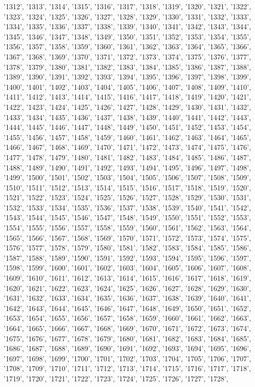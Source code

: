 '1312', '1313', '1314', '1315', '1316', '1317', '1318', '1319', '1320', '1321', '1322', '1323', '1324', '1325', '1326', '1327', '1328', '1329', '1330', '1331', '1332', '1333', '1334', '1335', '1336', '1337', '1338', '1339', '1340', '1341', '1342', '1343', '1344', '1345', '1346', '1347', '1348', '1349', '1350', '1351', '1352', '1353', '1354', '1355', '1356', '1357', '1358', '1359', '1360', '1361', '1362', '1363', '1364', '1365', '1366', '1367', '1368', '1369', '1370', '1371', '1372', '1373', '1374', '1375', '1376', '1377', '1378', '1379', '1380', '1381', '1382', '1383', '1384', '1385', '1386', '1387', '1388', '1389', '1390', '1391', '1392', '1393', '1394', '1395', '1396', '1397', '1398', '1399', '1400', '1401', '1402', '1403', '1404', '1405', '1406', '1407', '1408', '1409', '1410', '1411', '1412', '1413', '1414', '1415', '1416', '1417', '1418', '1419', '1420', '1421', '1422', '1423', '1424', '1425', '1426', '1427', '1428', '1429', '1430', '1431', '1432', '1433', '1434', '1435', '1436', '1437', '1438', '1439', '1440', '1441', '1442', '1443', '1444', '1445', '1446', '1447', '1448', '1449', '1450', '1451', '1452', '1453', '1454', '1455', '1456', '1457', '1458', '1459', '1460', '1461', '1462', '1463', '1464', '1465', '1466', '1467', '1468', '1469', '1470', '1471', '1472', '1473', '1474', '1475', '1476', '1477', '1478', '1479', '1480', '1481', '1482', '1483', '1484', '1485', '1486', '1487', '1488', '1489', '1490', '1491', '1492', '1493', '1494', '1495', '1496', '1497', '1498', '1499', '1500', '1501', '1502', '1503', '1504', '1505', '1506', '1507', '1508', '1509', '1510', '1511', '1512', '1513', '1514', '1515', '1516', '1517', '1518', '1519', '1520', '1521', '1522', '1523', '1524', '1525', '1526', '1527', '1528', '1529', '1530', '1531', '1532', '1533', '1534', '1535', '1536', '1537', '1538', '1539', '1540', '1541', '1542', '1543', '1544', '1545', '1546', '1547', '1548', '1549', '1550', '1551', '1552', '1553', '1554', '1555', '1556', '1557', '1558', '1559', '1560', '1561', '1562', '1563', '1564', '1565', '1566', '1567', '1568', '1569', '1570', '1571', '1572', '1573', '1574', '1575', '1576', '1577', '1578', '1579', '1580', '1581', '1582', '1583', '1584', '1585', '1586', '1587', '1588', '1589', '1590', '1591', '1592', '1593', '1594', '1595', '1596', '1597', '1598', '1599', '1600', '1601', '1602', '1603', '1604', '1605', '1606', '1607', '1608', '1609', '1610', '1611', '1612', '1613', '1614', '1615', '1616', '1617', '1618', '1619', '1620', '1621', '1622', '1623', '1624', '1625', '1626', '1627', '1628', '1629', '1630', '1631', '1632', '1633', '1634', '1635', '1636', '1637', '1638', '1639', '1640', '1641', '1642', '1643', '1644', '1645', '1646', '1647', '1648', '1649', '1650', '1651', '1652', '1653', '1654', '1655', '1656', '1657', '1658', '1659', '1660', '1661', '1662', '1663', '1664', '1665', '1666', '1667', '1668', '1669', '1670', '1671', '1672', '1673', '1674', '1675', '1676', '1677', '1678', '1679', '1680', '1681', '1682', '1683', '1684', '1685', '1686', '1687', '1688', '1689', '1690', '1691', '1692', '1693', '1694', '1695', '1696', '1697', '1698', '1699', '1700', '1701', '1702', '1703', '1704', '1705', '1706', '1707', '1708', '1709', '1710', '1711', '1712', '1713', '1714', '1715', '1716', '1717', '1718', '1719', '1720', '1721', '1722', '1723', '1724', '1725', '1726', '1727', '1728', 
